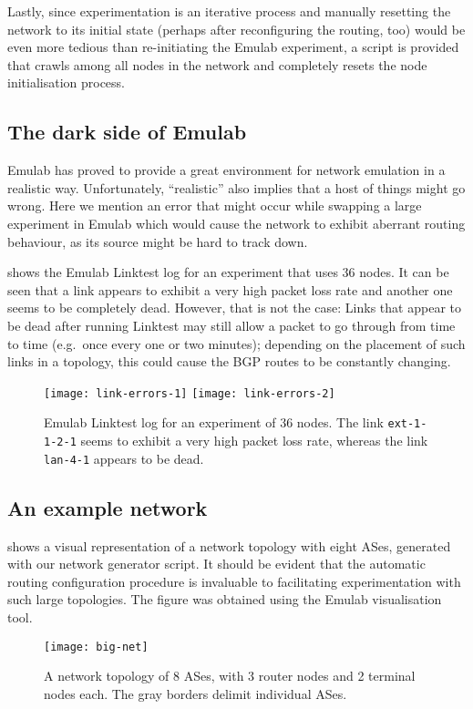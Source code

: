 Lastly, since experimentation is an iterative process and manually
resetting the network to its initial state (perhaps after reconfiguring the
routing, too) would be even more tedious than re-initiating the Emulab
experiment, a script is provided that crawls among all nodes in the network
and completely resets the node initialisation process.


\subsection{The dark side of Emulab}
\label{sec:emulab-problems}

Emulab has proved to provide a great environment for network emulation in a
realistic way. Unfortunately, ``realistic'' also implies that a host of
things might go wrong. Here we mention an error that might occur while
swapping a large experiment in Emulab which would cause the network to
exhibit aberrant routing behaviour, as its source might be hard to track
down.

 shows the Emulab Linktest log for an experiment that
uses 36 nodes. It can be seen that a link appears to exhibit a very high
packet loss rate and another one seems to be completely dead. However, that
is not the case: Links that appear to be dead after running Linktest may
still allow a packet to go through from time to time (e.g.\ once every one
or two minutes); depending on the placement of such links in a topology,
this could cause the BGP routes to be constantly changing.

\begin{figure}
  \centering
  \texttt{[image: link-errors-1]}
  \texttt{[image: link-errors-2]}
  \caption{Emulab Linktest log for an experiment of $36$ nodes. The link
    \texttt{ext-1-1-2-1} seems to exhibit a very high packet loss rate,
    whereas the link \texttt{lan-4-1} appears to be dead.}
  \label{fig:link-errors}
\end{figure}


\subsection{An example network}
\label{sec:network-example}

 shows a visual representation of a network topology with
eight ASes, generated with our network generator script. It should be
evident that the automatic routing configuration procedure is invaluable to
facilitating experimentation with such large topologies. The figure was
obtained using the Emulab visualisation tool.

\begin{figure}[!b]
  \centering
  \texttt{[image: big-net]}
  \caption{A network topology of 8 ASes, with 3 router nodes and 2 terminal
    nodes each. The gray borders delimit individual ASes.}
  \label{fig:big-net}
\end{figure}



